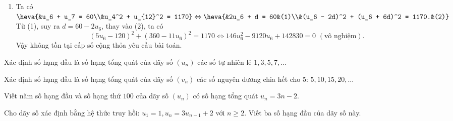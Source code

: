 \begin{bt}
{\begin{enumerate}
			Vậy số hạng đầu của cấp số cộng là $u_1 = 3$, công sai là $d = 2$ hoặc $u_1 = -17$, $d = 2$.
			\item Ta có $\heva{&u_6 + u_7 = 60\\&u_4^2 + u_{12}^2 = 1170} \Leftrightarrow \heva{&2u_6 + d = 60&(1)\\&(u_6 - 2d)^2 + (u_6 + 6d)^2 = 1170.&(2)}$\\
			Từ (1), suy ra $d = 60 - 2u_6$, thay vào (2), ta có
			$$(5u_6 - 120)^2 + (360 - 11u_6)^2 = 1170 \Leftrightarrow 146u_6^2 - 9120u_6 + 142830 = 0 \,\, (\text{vô nghiệm}).$$ 
			Vậy không tồn tại cấp số cộng thỏa yêu cầu bài toán.
		\end{enumerate}
	}
\end{bt}

\begin{bt}%
	Xác định số hạng đầu là số hạng tổng quát của dãy số $(u_n)$ các số tự nhiên lẻ $1, 3, 5, 7, \ldots $
\end{bt}

\begin{bt}%
	Xác định số hạng đầu là số hạng tổng quát của dãy số $(v_n)$ các số nguyên dương chia hết cho $5$: $5,10,15,20,\ldots$
\end{bt}

\begin{bt}%
	Viết năm số hạng đầu và số hạng thứ $100$ của dãy số $(u_n)$ có số hạng tổng quát $u_n=3n-2$.
\end{bt}

\begin{bt}%
	Cho dãy số xác định bằng hệ thức truy hồi: $u_1=1, u_n=3u_{n-1}+2$ với $n\ge 2$. Viết ba số hạng đầu của dãy số này.
\end{bt}

